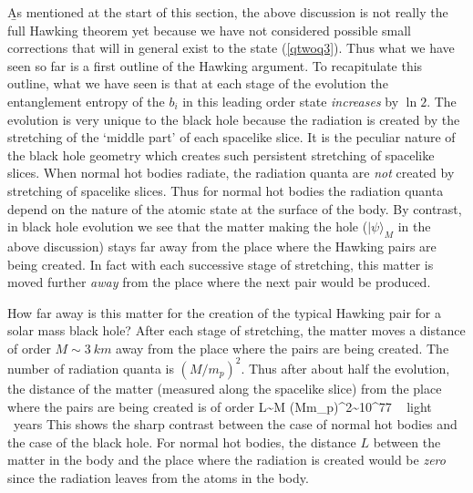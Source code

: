 \documentclass[12pt]{article}
\begin{document}
\b

As mentioned at the start of this section, the above discussion is not really the full Hawking theorem yet because we have not considered possible small corrections that will in general exist to the state (\ref{qtwoq3}). Thus what we have seen so far is a first outline of the Hawking argument. To recapitulate this outline, what we have seen is that at each stage of the evolution the entanglement entropy of the $b_i$ in this leading order state {\it increases} by $\ln 2$. The evolution is very unique to the black hole because the radiation is created by the stretching of the `middle part' of each spacelike slice. It is the peculiar nature of the black hole geometry which creates such persistent stretching of spacelike slices. When normal hot bodies radiate, the radiation quanta are {\it not} created by stretching of spacelike slices. Thus for normal hot bodies the radiation quanta depend on the nature of the atomic state at the surface of the body. By contrast, in  black hole evolution  we see that the matter making the hole ($|\psi\rangle_M$ in the above discussion) stays far away from the place where the Hawking pairs are being created. In fact with each successive stage of stretching, this matter is moved further {\it away} from the place where the next pair would be produced. 

How far away is this matter for the creation of the typical Hawking pair for a solar mass black hole? After each stage of stretching, the matter moves a distance of order $ M\sim 3~km$ away from the place where the pairs are being created. The number of radiation quanta is $(M/m_p)^2$. Thus after about half the evolution, the distance of the matter (measured along the spacelike slice) from the place where the pairs are being created is of order
\be
L\sim  M ({M\over m_p})^2\sim 10^{77} ~ {\rm light ~years}
\ee
This shows the sharp contrast between the case of normal hot bodies and the case of the black hole. For normal hot bodies, the distance $L$ between the matter in the body and the place where the radiation is created would be {\it zero} since the radiation leaves from the atoms in the body.
\end{document}
